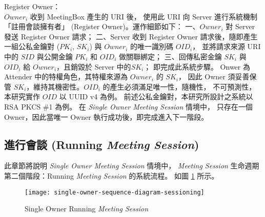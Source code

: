 \begin{steps}
    \item Register Owner：\\
        $Owner_{i}$ 收到 MeetingBox 產生的 URI 後，
        使用此 URI 向 Server 進行系統機制「註冊會談擁有者」 (Register Owner)。運作細節如下：
        一、$Owner_{i}$ 對 Server 發送 Register Owner 請求；
        二、Server 收到 Register Owner 請求後，隨即產生一組公私金鑰對 ($PK_{i}$, $SK_{i}$)
        與 $Owner_{i}$ 的唯一識別碼 $OID_{i}$，
        並將請求來源 URI 中的 $SID$ 與公開金鑰 $PK_{i}$ 和 $OID_{i}$ 做關聯綁定；
        三、回傳私密金鑰 $SK_{i}$ 與 $OID_{i}$ 給 $Owner_{i}$，且銷毀於 Server 中的$SK_{i}$；
        即完成此系統步驟。
        Onwer 為 Attender 中的特權角色，其特權來源為 $Owner_{i}$ 的 $SK_{i}$，
        因此 Owner 須妥善保管 $SK_{i}$，維持其機密性。$OID_{i}$ 的產生必須滿足唯一性，隨機性，
        不可預測性，本研究實作 $OID$ 以 UUID v4 為例。
        前述公私金鑰對，本研究所設計之系統以 RSA PKCS \#1 為例。
        在 {\it Single Owner Meeting Session} 情境中，
        只存在一個 Owner，因此當唯一 Owner 執行成功後，即完成進入下一階段。
\end{steps}

\subsection{進行會談 (Running {\it Meeting Session})}

    此章節將說明 {\it Single Owner Meeting Session} 情境中，
{\it Meeting Session} 生命週期第二個階段：Running {\it Meeting Session} 的系統流程。
如圖 \ref{fig.s-o-sessioning} 所示。

\begin{figure}[H]
    \centering
    \texttt{[image: single-owner-sequence-diagram-sessioning]}
    \caption{Single Owner Running {\it Meeting Session}}
    \label{fig.s-o-sessioning}
\end{figure}

